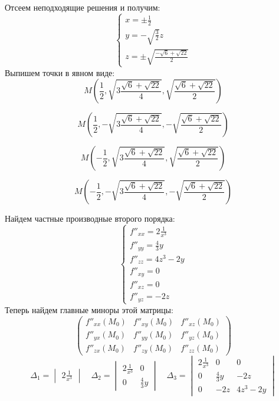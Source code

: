 \documentclass{article}
\begin{document}
Отсеем неподходящие решения и получим:
\begin{equation*}
    \begin{cases}
    x = \pm \frac{1}{2} \\
    y = - \sqrt{\frac{3}{2}} z \\
    z = \pm \sqrt{\frac{-\sqrt{6} + \sqrt{22}}{2}}
    \end{cases}
\end{equation*}
Выпишем точки в явном виде:
\[ M\left( \frac{1}{2}, \sqrt{3\frac{\sqrt{6} + \sqrt{22}}{4}}, 
\sqrt{\frac{\sqrt{6} + \sqrt{22}}{2}}\right) \]

\[ M\left( \frac{1}{2}, -\sqrt{3\frac{\sqrt{6} + \sqrt{22}}{4}}, 
-\sqrt{\frac{\sqrt{6} + \sqrt{22}}{2}}\right) \]

\[ M\left( -\frac{1}{2}, \sqrt{3\frac{\sqrt{6} + \sqrt{22}}{4}}, 
\sqrt{\frac{\sqrt{6} + \sqrt{22}}{2}}\right) \]

\[ M\left( -\frac{1}{2}, -\sqrt{3\frac{\sqrt{6} + \sqrt{22}}{4}}, 
-\sqrt{\frac{\sqrt{6} + \sqrt{22}}{2}}\right) \]

Найдем частные производные второго порядка:
\begin{equation*}
    \begin{cases}
    f''_{xx} = 2\frac{1}{x^{3}} \\
    f''_{yy} = \frac{4}{3} y \\
    f''_{zz} = 4z^3 - 2y \\
    f''_{xy} = 0 \\
    f''_{xz} = 0 \\
    f''_{yz} = -2 z
    \end{cases}
\end{equation*}
Теперь найдем главные миноры этой матрицы:
\[
\left(
\begin{array}{ccc}
    f''_{xx}(M_0) & f''_{xy}(M_0) & f''_{xz}(M_0) \\
    f''_{yx}(M_0) & f''_{yy}(M_0) & f''_{yz}(M_0) \\
    f''_{zx}(M_0) & f''_{zy}(M_0) & f''_{zz}(M_0)
\end{array}
\right)
\]
\[
\Delta_1 = 
\begin{vmatrix}
2\frac{1}{x^3}
\end{vmatrix}  
\quad \Delta_2 = 
\begin{vmatrix}
     2\frac{1}{x^{3}} & 0  \\
     0 & \frac{4}{3} y 
\end{vmatrix}
\quad \Delta_3 = 
\begin{vmatrix}
    2\frac{1}{x^{3}} & 0 & 0 \\
    0 & \frac{4}{3} y & -2z \\
    0 & -2z & 4z^3 - 2y
\end{vmatrix}
\]
\end{document}
